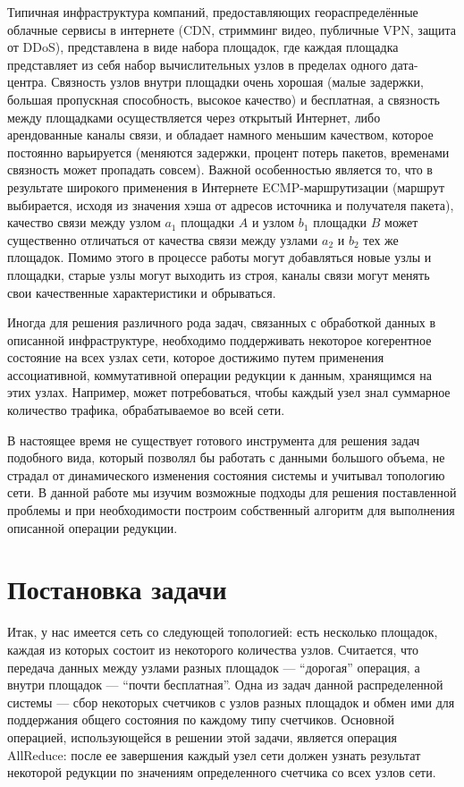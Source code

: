 \documentclass{article}
\theoremstyle{plain}
\theoremstyle{plain}
\theoremstyle{plain}
\theoremstyle{plain}
\theoremstyle{definition}
\theoremstyle{remark}
\theoremstyle{plain}
\begin{document}
Типичная инфраструктура компаний, предоставляющих геораспределённые облачные сервисы в интернете (CDN, стримминг видео, публичные VPN, защита от DDoS), представлена в виде набора площадок, где каждая площадка представляет из себя набор вычислительных узлов в пределах одного дата-центра. Связность узлов внутри площадки очень хорошая (малые задержки, большая пропускная способность, высокое качество) и бесплатная, а связность между площадками осуществляется через открытый Интернет, либо арендованные каналы связи, и обладает намного меньшим качеством, которое постоянно варьируется (меняются задержки, процент потерь пакетов, временами связность может пропадать совсем). Важной особенностью является то, что в результате широкого применения в Интернете ECMP-маршрутизации (маршрут выбирается, исходя из значения хэша от адресов источника и получателя пакета), качество связи между узлом $a_1$ площадки $A$ и узлом $b_1$ площадки $B$ может существенно отличаться от качества связи между узлами $a_2$ и $b_2$ тех же площадок. Помимо этого в процессе работы могут добавляться новые узлы и площадки, старые узлы могут выходить из строя, каналы связи могут менять свои качественные характеристики и обрываться.

Иногда для решения различного рода задач, связанных с обработкой данных в описанной инфраструктуре, необходимо поддерживать некоторое когерентное состояние на всех узлах сети, которое достижимо путем применения ассоциативной, коммутативной операции редукции к данным, хранящимся на этих узлах. Например, может потребоваться, чтобы каждый узел знал суммарное количество трафика, обрабатываемое во всей сети.

В настоящее время не существует готового инструмента для решения задач подобного вида, который позволял бы работать с данными большого объема, не страдал от динамического изменения состояния системы и учитывал топологию сети. В данной работе мы изучим возможные подходы для решения поставленной проблемы и при необходимости построим собственный алгоритм для выполнения описанной операции редукции.

\section{Постановка задачи}

Итак, у нас имеется сеть со следующей топологией: есть несколько площадок, каждая из которых состоит из некоторого количества узлов. Считается, что передача данных между узлами разных площадок — \enquote{дорогая} операция, а внутри площадок — \enquote{почти бесплатная}. Одна из задач данной распределенной системы — сбор некоторых счетчиков с узлов разных площадок и обмен ими для поддержания общего состояния по каждому типу счетчиков. Основной операцией, использующейся в решении этой задачи, является операция AllReduce: после ее завершения каждый узел сети должен узнать результат некоторой редукции по значениям определенного счетчика со всех узлов сети.
\end{document}
